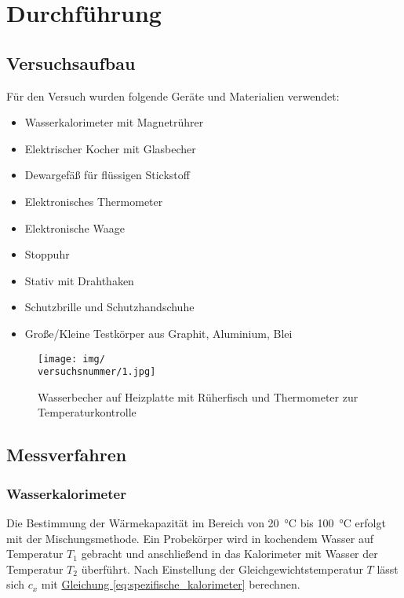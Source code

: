 \chapter{Durchführung}

\section{Versuchsaufbau}
Für den Versuch wurden folgende Geräte und Materialien verwendet:
\begin{itemize}
  \item Wasserkalorimeter mit Magnetrührer
  \item Elektrischer Kocher mit Glasbecher
  \item Dewargefäß für flüssigen Stickstoff
  \item Elektronisches Thermometer
  \item Elektronische Waage
  \item Stoppuhr
  \item Stativ mit Drahthaken
  \item Schutzbrille und Schutzhandschuhe
  \item Große/Kleine Testkörper aus Graphit, Aluminium, Blei
\end{itemize}


\begin{figure}[h!]
    \centering
    \texttt{[image: img/\\versuchsnummer/1.jpg]}
    \caption{Wasserbecher auf Heizplatte mit Rüherfisch und Thermometer zur Temperaturkontrolle}
    \label{img:1}
\end{figure}

\newpage


\section{Messverfahren}
\subsection*{Wasserkalorimeter}
Die Bestimmung der Wärmekapazität im Bereich von \SI{20}{\celsius} bis \SI{100}{\celsius} erfolgt mit der Mischungsmethode.  
Ein Probekörper wird in kochendem Wasser auf Temperatur \(T_1\) gebracht und anschließend in das Kalorimeter mit Wasser der Temperatur \(T_2\) überführt. Nach Einstellung der Gleichgewichtstemperatur \(T\) lässt sich \(c_x\) mit \hyperref[eq:spezifische_kalorimeter]{Gleichung \ref*{eq:spezifische_kalorimeter}} berechnen.  


